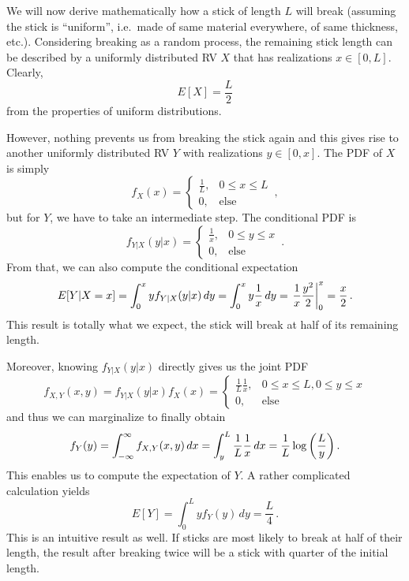 \begin{ex}\label{ex:broken_stick}
We will now derive mathematically how a stick of length $L$ will break (assuming the stick is \enquote{uniform}, i.e.~made of same material everywhere, of same thickness, etc.). Considering breaking as a random process, the remaining stick length can be described by a uniformly distributed RV $X$ that has realizations $x \in [0, L]$. Clearly,
\begin{equation*}
E[X] = \frac{L}{2}
\end{equation*}
from the properties of uniform distributions.

However, nothing prevents us from breaking the stick again and this gives rise to another uniformly distributed RV $Y$ with realizations $y \in [0, x]$. The PDF of $X$ is simply
\begin{equation*}
f_X(x) = \begin{cases} \frac{1}{L}, & 0 \leq x \leq L \\ 0, & \text{else} \end{cases} \, ,
\end{equation*}
but for $Y$, we have to take an intermediate step. The conditional PDF is
\begin{equation*}
f_{Y | X}(y | x) = \begin{cases} \frac{1}{x}, & 0 \leq y \leq x \\ 0, & \text{else} \end{cases} \, .
\end{equation*}
From that, we can also compute the conditional expectation
\begin{equation*}
E[Y | X = x] = \int_0^x y f_{Y | X}(y | x) \, dy = \int_0^x y \frac{1}{x} \, dy = \eval{\frac{1}{x} \frac{y^2}{2}}_0^x = \frac{x}{2} \, .
\end{equation*}
This result is totally what we expect, the stick will break at half of its remaining length.

Moreover, knowing $f_{Y | X}(y | x)$ directly gives us the joint PDF
\begin{equation*}
f_{X, Y}(x, y) = f_{Y | X}(y | x) f_X(x) = \begin{cases} \frac{1}{L} \frac{1}{x}, & 0 \leq x \leq L, 0 \leq y \leq x \\ 0, & \text{else} \end{cases}
\end{equation*}
and thus we can marginalize to finally obtain
\begin{equation*}
f_Y(y) = \int_{- \infty}^\infty f_{X, Y}(x, y) \, dx = \int_y^L \frac{1}{L} \frac{1}{x} \, dx = \frac{1}{L} \log\qty(\frac{L}{y}) \, .
\end{equation*}
This enables us to compute the expectation of $Y$. A rather complicated calculation yields
\begin{equation*}
E[Y] = \int_0^L y f_Y(y) \, dy = \frac{L}{4} \, .
\end{equation*}
This is an intuitive result as well. If sticks are most likely to break at half of their length, the result after breaking twice will be a stick with quarter of the initial length.
\end{ex}



